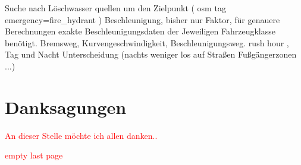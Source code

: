 \documentclass[12pt,a4paper]{article}
\newcommand\todo[1]{\textcolor{red}{#1}}
\begin{document}
Suche nach Löschwasser quellen um den Zielpunkt ( osm tag emergency=fire\_hydrant )
Beschleunigung, bisher nur Faktor, für genauere Berechnungen exakte Beschleunigungsdaten der Jeweiligen Fahrzeugklasse benötigt. Bremsweg, Kurvengeschwindigkeit, Beschleunigungsweg.
rush hour , Tag und Nacht Unterscheidung (nachts weniger los auf Straßen\/ Fußgängerzonen ...)

\printbibliography

\newpage
\section*{Danksagungen}
\todo{An dieser Stelle möchte ich allen danken.. }

\newpage
\todo{empty last page}
\end{document}
